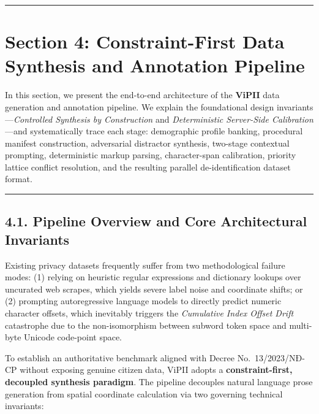 \documentclass[
]{article}
\begin{document}
\begin{center}\rule{0.5\linewidth}{0.5pt}\end{center}

\section{Section 4: Constraint-First Data Synthesis and Annotation
Pipeline}\label{section-4-constraint-first-data-synthesis-and-annotation-pipeline}

In this section, we present the end-to-end architecture of the
\textbf{ViPII} data generation and annotation pipeline. We explain the
foundational design invariants---\emph{Controlled Synthesis by
Construction} and \emph{Deterministic Server-Side Calibration}---and
systematically trace each stage: demographic profile banking, procedural
manifest construction, adversarial distractor synthesis, two-stage
contextual prompting, deterministic markup parsing, character-span
calibration, priority lattice conflict resolution, and the resulting
parallel de-identification dataset format.

\begin{center}\rule{0.5\linewidth}{0.5pt}\end{center}

\subsection{4.1. Pipeline Overview and Core Architectural
Invariants}\label{pipeline-overview-and-core-architectural-invariants}

Existing privacy datasets frequently suffer from two methodological
failure modes: (1) relying on heuristic regular expressions and
dictionary lookups over uncurated web scrapes, which yields severe label
noise and coordinate shifts; or (2) prompting autoregressive language
models to directly predict numeric character offsets, which inevitably
triggers the \emph{Cumulative Index Offset Drift} catastrophe due to the
non-isomorphism between subword token space and multi-byte Unicode
code-point space.

To establish an authoritative benchmark aligned with Decree
No.~13/2023/NĐ-CP without exposing genuine citizen data, ViPII adopts a
\textbf{constraint-first, decoupled synthesis paradigm}. The pipeline
decouples natural language prose generation from spatial coordinate
calculation via two governing technical invariants:
\end{document}
